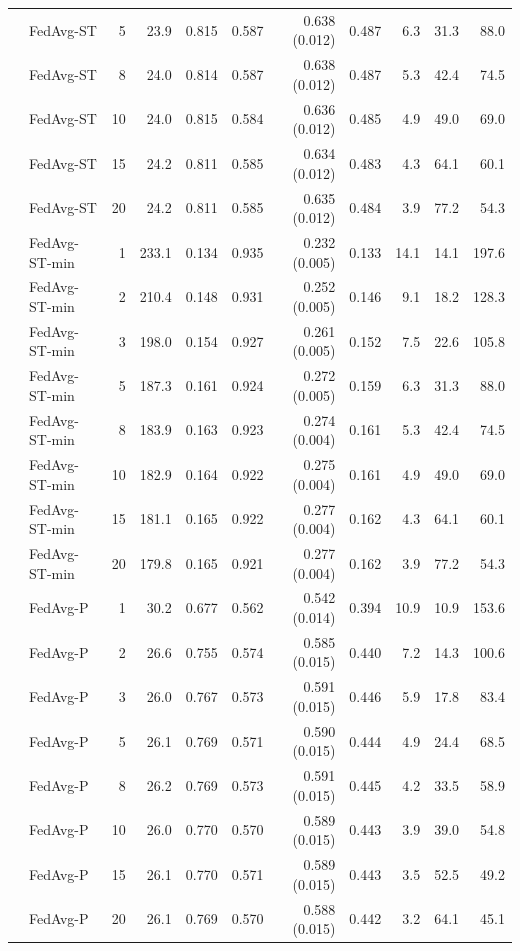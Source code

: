 \begin{longtable}{llrrrrrrrrr}
 & FedAvg-ST & 5 & 23.9 & 0.815 & 0.587 & 0.638 (0.012) & 0.487 & 6.3 & 31.3 & 88.0 \\
 & FedAvg-ST & 8 & 24.0 & 0.814 & 0.587 & 0.638 (0.012) & 0.487 & 5.3 & 42.4 & 74.5 \\
 & FedAvg-ST & 10 & 24.0 & 0.815 & 0.584 & 0.636 (0.012) & 0.485 & 4.9 & 49.0 & 69.0 \\
 & FedAvg-ST & 15 & 24.2 & 0.811 & 0.585 & 0.634 (0.012) & 0.483 & 4.3 & 64.1 & 60.1 \\
 & FedAvg-ST & 20 & 24.2 & 0.811 & 0.585 & 0.635 (0.012) & 0.484 & 3.9 & 77.2 & 54.3 \\
 & FedAvg-ST-min & 1 & 233.1 & 0.134 & 0.935 & 0.232 (0.005) & 0.133 & 14.1 & 14.1 & 197.6 \\
 & FedAvg-ST-min & 2 & 210.4 & 0.148 & 0.931 & 0.252 (0.005) & 0.146 & 9.1 & 18.2 & 128.3 \\
 & FedAvg-ST-min & 3 & 198.0 & 0.154 & 0.927 & 0.261 (0.005) & 0.152 & 7.5 & 22.6 & 105.8 \\
 & FedAvg-ST-min & 5 & 187.3 & 0.161 & 0.924 & 0.272 (0.005) & 0.159 & 6.3 & 31.3 & 88.0 \\
 & FedAvg-ST-min & 8 & 183.9 & 0.163 & 0.923 & 0.274 (0.004) & 0.161 & 5.3 & 42.4 & 74.5 \\
 & FedAvg-ST-min & 10 & 182.9 & 0.164 & 0.922 & 0.275 (0.004) & 0.161 & 4.9 & 49.0 & 69.0 \\
 & FedAvg-ST-min & 15 & 181.1 & 0.165 & 0.922 & 0.277 (0.004) & 0.162 & 4.3 & 64.1 & 60.1 \\
 & FedAvg-ST-min & 20 & 179.8 & 0.165 & 0.921 & 0.277 (0.004) & 0.162 & 3.9 & 77.2 & 54.3 \\
 & FedAvg-P & 1 & 30.2 & 0.677 & 0.562 & 0.542 (0.014) & 0.394 & 10.9 & 10.9 & 153.6 \\
 & FedAvg-P & 2 & 26.6 & 0.755 & 0.574 & 0.585 (0.015) & 0.440 & 7.2 & 14.3 & 100.6 \\
 & FedAvg-P & 3 & 26.0 & 0.767 & 0.573 & 0.591 (0.015) & 0.446 & 5.9 & 17.8 & 83.4 \\
 & FedAvg-P & 5 & 26.1 & 0.769 & 0.571 & 0.590 (0.015) & 0.444 & 4.9 & 24.4 & 68.5 \\
 & FedAvg-P & 8 & 26.2 & 0.769 & 0.573 & 0.591 (0.015) & 0.445 & 4.2 & 33.5 & 58.9 \\
 & FedAvg-P & 10 & 26.0 & 0.770 & 0.570 & 0.589 (0.015) & 0.443 & 3.9 & 39.0 & 54.8 \\
 & FedAvg-P & 15 & 26.1 & 0.770 & 0.571 & 0.589 (0.015) & 0.443 & 3.5 & 52.5 & 49.2 \\
 & FedAvg-P & 20 & 26.1 & 0.769 & 0.570 & 0.588 (0.015) & 0.442 & 3.2 & 64.1 & 45.1 \\

\end{longtable}